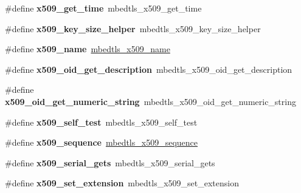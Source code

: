 \begin{DoxyCompactItemize}
\item 
\mbox{\label{compat-1_83_8h_ad00bb2f2753ce699629001ed1289fdd0}} 
\#define {\bfseries x509\+\_\+get\+\_\+time}~mbedtls\+\_\+x509\+\_\+get\+\_\+time
\item 
\mbox{\label{compat-1_83_8h_a3727e5c02a342e3cabe62e6f2ad1b7b2}} 
\#define {\bfseries x509\+\_\+key\+\_\+size\+\_\+helper}~mbedtls\+\_\+x509\+\_\+key\+\_\+size\+\_\+helper
\item 
\mbox{\label{compat-1_83_8h_a850f40c258b0b2ae1df5209b3a737356}} 
\#define {\bfseries x509\+\_\+name}~\mbox{\hyperlink{group__x509__module_ga2272228c7776102328df31623af3168c}{mbedtls\+\_\+x509\+\_\+name}}
\item 
\mbox{\label{compat-1_83_8h_a875d90c75ebc55a691dca57036b429fa}} 
\#define {\bfseries x509\+\_\+oid\+\_\+get\+\_\+description}~mbedtls\+\_\+x509\+\_\+oid\+\_\+get\+\_\+description
\item 
\mbox{\label{compat-1_83_8h_af6be434020656372cbc33d85264ada31}} 
\#define {\bfseries x509\+\_\+oid\+\_\+get\+\_\+numeric\+\_\+string}~mbedtls\+\_\+x509\+\_\+oid\+\_\+get\+\_\+numeric\+\_\+string
\item 
\mbox{\label{compat-1_83_8h_ad3e6a7e7511b092174b3580385216ca7}} 
\#define {\bfseries x509\+\_\+self\+\_\+test}~mbedtls\+\_\+x509\+\_\+self\+\_\+test
\item 
\mbox{\label{compat-1_83_8h_ab694b0c2c7b30557a5b61bdbeec6eab8}} 
\#define {\bfseries x509\+\_\+sequence}~\mbox{\hyperlink{group__x509__module_gabd52d60a09315854d9ef849d02154f35}{mbedtls\+\_\+x509\+\_\+sequence}}
\item 
\mbox{\label{compat-1_83_8h_aef5b60c300ccd65c99cf179f72a7766c}} 
\#define {\bfseries x509\+\_\+serial\+\_\+gets}~mbedtls\+\_\+x509\+\_\+serial\+\_\+gets
\item 
\mbox{\label{compat-1_83_8h_ae79f625906aeb7d7cbec6f31fb1318ea}} 
\#define {\bfseries x509\+\_\+set\+\_\+extension}~mbedtls\+\_\+x509\+\_\+set\+\_\+extension
\item 
\mbox{\label{compat-1_83_8h_ae678f08ce4b5a62e17c28e00d59a2c57}} 

\end{DoxyCompactItemize}
